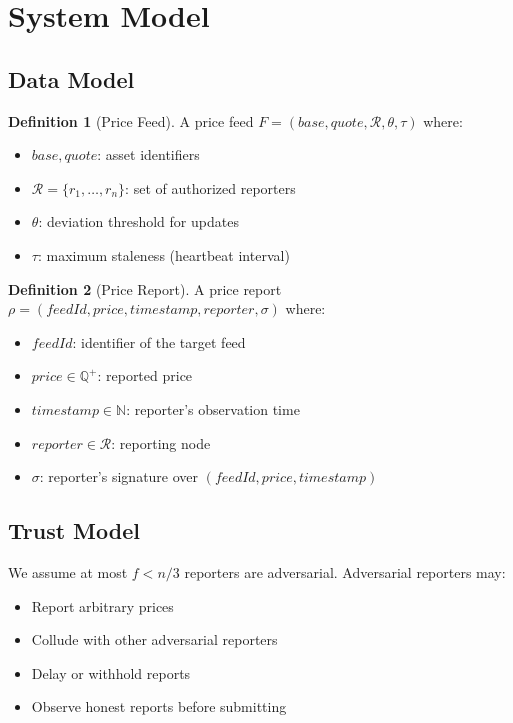 \documentclass[11pt,a4paper]{article}
\theoremstyle{definition}
\newtheorem{definition}{Definition}
\begin{document}
\section{System Model}

\subsection{Data Model}

\begin{definition}[Price Feed]
A price feed $F = (base, quote, \mathcal{R}, \theta, \tau)$ where:
\begin{itemize}
    \item $base, quote$: asset identifiers
    \item $\mathcal{R} = \{r_1, \ldots, r_n\}$: set of authorized reporters
    \item $\theta$: deviation threshold for updates
    \item $\tau$: maximum staleness (heartbeat interval)
\end{itemize}
\end{definition}

\begin{definition}[Price Report]
A price report $\rho = (feedId, price, timestamp, reporter, \sigma)$ where:
\begin{itemize}
    \item $feedId$: identifier of the target feed
    \item $price \in \mathbb{Q}^+$: reported price
    \item $timestamp \in \mathbb{N}$: reporter's observation time
    \item $reporter \in \mathcal{R}$: reporting node
    \item $\sigma$: reporter's signature over $(feedId, price, timestamp)$
\end{itemize}
\end{definition}

\subsection{Trust Model}

We assume at most $f < n/3$ reporters are adversarial. Adversarial reporters may:
\begin{itemize}
    \item Report arbitrary prices
    \item Collude with other adversarial reporters
    \item Delay or withhold reports
    \item Observe honest reports before submitting
\end{itemize}
\end{document}
